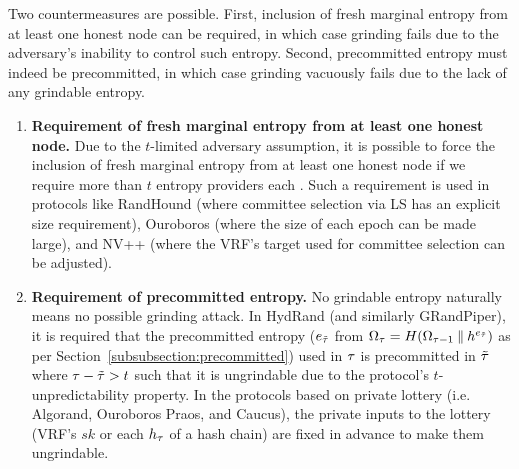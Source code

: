 Two countermeasures are possible. First, inclusion of fresh marginal entropy from at least one honest node can be required, in which case grinding fails due to the adversary's inability to control such entropy. Second, precommitted entropy must indeed be precommitted, in which case grinding vacuously fails due to the lack of any grindable entropy.
\begin{enumerate}
\item \textbf{Requirement of fresh marginal entropy from at least one honest node.} Due to the $t$-limited adversary assumption, it is possible to force the inclusion of fresh marginal entropy from at least one honest node if we require more than $t$ entropy providers each \epoch. Such a requirement is used in protocols like RandHound (where committee selection via LS has an explicit size requirement), Ouroboros (where the size of each epoch can be made large), and NV++ (where the VRF's target used for committee selection can be adjusted).
\item \textbf{Requirement of precommitted entropy.} No grindable entropy naturally means no possible grinding attack. In HydRand (and similarly GRandPiper), it is required that the precommitted entropy ($e_{\tilde{\tau}}$ from $\Omega_\tau = H(\Omega_{\tau - 1} \mathbin\Vert h^{e_{\tilde{\tau}}})$ as per Section~\ref{subsubsection:precommitted}) used in \epoch $\tau$ is precommitted in \epoch $\tilde{\tau}$ where $\tau - \tilde{\tau} > t$ such that it is ungrindable due to the protocol's $t$-unpredictability property. In the protocols based on private lottery (i.e. Algorand, Ouroboros Praos, and Caucus), the private inputs to the lottery (VRF's $sk$ or each $h_\tau$ of a hash chain) are fixed in advance to make them ungrindable.
\end{enumerate}


